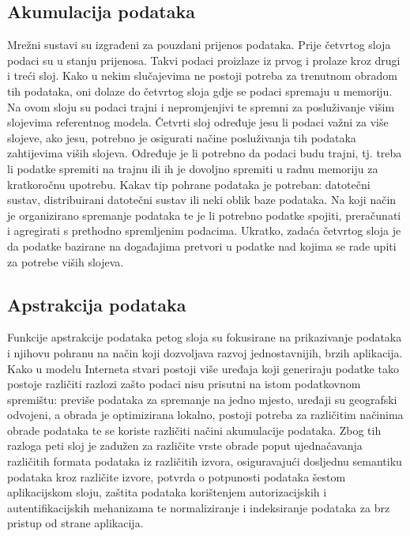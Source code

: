 \documentclass[times, utf8, diplomski]{fer}
\begin{document}
\subsection{Akumulacija podataka}
Mrežni sustavi su izgrađeni za pouzdani prijenos podataka. Prije četvrtog sloja podaci su u stanju prijenosa. Takvi podaci proizlaze iz prvog i prolaze kroz drugi i treći sloj. Kako u nekim slučajevima ne postoji potreba za trenutnom obradom tih podataka, oni dolaze do četvrtog sloja gdje se podaci spremaju u memoriju. Na ovom sloju su podaci trajni i nepromjenjivi te spremni za posluživanje višim slojevima referentnog modela. Četvrti sloj određuje jesu li podaci važni za više slojeve, ako jesu, potrebno je osigurati načine posluživanja tih podataka zahtijevima viših slojeva. Određuje je li potrebno da podaci budu trajni, tj. treba li podatke spremiti na trajnu ili ih je dovoljno spremiti u radnu memoriju za kratkoročnu upotrebu. Kakav tip pohrane podataka je potreban: datotečni sustav, distribuirani datotečni sustav ili neki oblik baze podataka. Na koji način je organizirano spremanje podataka te je li potrebno podatke spojiti, preračunati i agregirati s prethodno spremljenim podacima. Ukratko, zadaća četvrtog sloja je da podatke bazirane na događajima pretvori u podatke nad kojima se rade upiti za potrebe viših slojeva.

\subsection{Apstrakcija podataka}
Funkcije apstrakcije podataka petog sloja su fokusirane na prikazivanje podataka i njihovu pohranu na način koji dozvoljava razvoj jednostavnijih, brzih aplikacija. Kako u modelu Interneta stvari postoji više uređaja koji generiraju podatke tako postoje različiti razlozi zašto podaci nisu prisutni na istom podatkovnom spremištu: previše podataka za spremanje na jedno mjesto, uređaji su geografski odvojeni, a obrada je optimizirana lokalno, postoji potreba za različitim načinima obrade podataka te se koriste različiti načini akumulacije podataka. Zbog tih razloga peti sloj je zadužen za različite vrste obrade poput ujednačavanja različitih formata podataka iz različitih izvora, osiguravajući dosljednu semantiku podataka kroz različite izvore, potvrda o potpunosti podataka šestom aplikacijskom sloju, zaštita podataka korištenjem autorizacijskih i autentifikacijskih mehanizama te normaliziranje i indeksiranje podataka za brz pristup od strane aplikacija.
\end{document}
